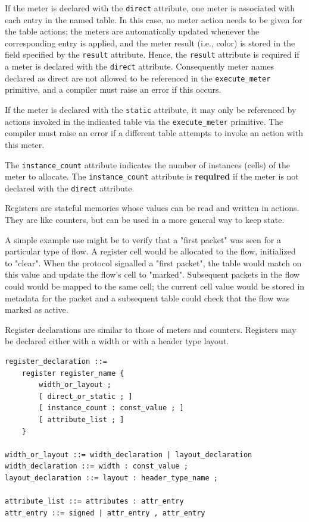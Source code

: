 \documentclass[12pt]{article}
\begin{document}
If the meter is declared with the \texttt{direct} attribute, one meter
is associated with each entry in the named table. In this case, no 
meter action needs to be given for the table actions; the meters are 
automatically updated whenever the corresponding entry is applied,
and the meter result (i.e., color) is stored in the field specified 
by the \texttt{result} attribute. Hence, the \texttt{result} attribute
is required if a meter is declared with the \texttt{direct} attribute.
Consequently meter names declared as direct are not allowed to be 
referenced in the \texttt{execute_meter} primitive, and a compiler must
raise an error if this occurs. 

If the meter is declared with the \texttt{static} attribute, it may only
be referenced by actions invoked in the indicated table via the \texttt{execute_meter}
primitive. The compiler must raise an error if a different table 
attempts to invoke an action with this meter.

The \texttt{instance_count} attribute indicates the number of
instances (cells) of the meter to allocate.  The
\texttt{instance_count} attribute is \textbf{required} if the meter
is not declared with the \texttt{direct} attribute.


Registers are stateful memories whose values can be read and written
in actions.  They are like counters, but can be used in a more general
way to keep state.

A simple example use might be to verify that a "first packet" was seen
for a particular type of flow. A register cell would be allocated to
the flow, initialized to "clear". When the protocol signalled a "first
packet", the table would match on this value and update the flow's
cell to "marked".  Subsequent packets in the flow could would be
mapped to the same cell; the current cell value would be stored in
metadata for the packet and a subsequent table could check that the
flow was marked as active.

Register declarations are similar to those of meters and
counters. Registers may be declared either with a width or with a
header type layout.

\begin{lstlisting}[style=BNFstyle]
register_declaration ::= 
    register register_name {
        width_or_layout ;
        [ direct_or_static ; ]
        [ instance_count : const_value ; ]
        [ attribute_list ; ]
    }

width_or_layout ::= width_declaration | layout_declaration
width_declaration ::= width : const_value ;
layout_declaration ::= layout : header_type_name ;

attribute_list ::= attributes : attr_entry
attr_entry ::= signed | attr_entry , attr_entry
\end{lstlisting}
\end{document}
